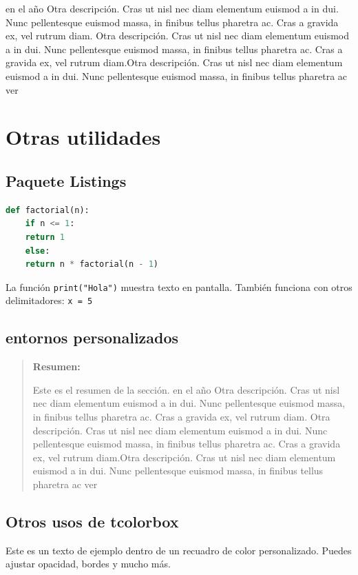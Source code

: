 \documentclass[b5paper, 10pt]{book}
\newenvironment{miResumen}
{
	\begin{quote}
		\bfseries Resumen:\quad
	}
	{
	\end{quote}
}
\begin{document}
\citeauthor{Liang2022} en el año \citeyear{Liang2022} Otra descripción. Cras ut nisl nec diam elementum euismod a in dui. Nunc pellentesque euismod massa, in finibus tellus pharetra ac. Cras a gravida ex, vel rutrum diam. Otra descripción. Cras ut nisl nec diam elementum euismod a in dui. Nunc pellentesque euismod massa, in finibus tellus pharetra ac. Cras a gravida ex, vel rutrum diam.Otra descripción. Cras ut nisl nec diam elementum euismod a in dui. Nunc pellentesque euismod massa, in finibus tellus pharetra ac ver

\chapter {Otras utilidades}
\section {Paquete Listings}
\begin{lstlisting}[language=Python,caption={Ejemplo en Python},label={code:python}]
	def factorial(n):
	if n <= 1:
	return 1
	else:
	return n * factorial(n - 1)
\end{lstlisting}

La función \lstinline|print("Hola")| muestra texto en pantalla.
También funciona con otros delimitadores: \lstinline!x = 5!


\section {entornos personalizados}
\begin{miResumen}
	Este es el resumen de la sección. \citeauthor{Liang2022} en el año \citeyear{Liang2022} Otra descripción. Cras ut nisl nec diam elementum euismod a in dui. Nunc pellentesque euismod massa, in finibus tellus pharetra ac. Cras a gravida ex, vel rutrum diam. Otra descripción. Cras ut nisl nec diam elementum euismod a in dui. Nunc pellentesque euismod massa, in finibus tellus pharetra ac. Cras a gravida ex, vel rutrum diam.Otra descripción. Cras ut nisl nec diam elementum euismod a in dui. Nunc pellentesque euismod massa, in finibus tellus pharetra ac ver
\end{miResumen}

\section {Otros usos de tcolorbox}
\begin{tcolorbox}[colback=blue!5!white,colframe=blue!75!black,title=Ejemplo de tcolorbox]
	Este es un texto de ejemplo dentro de un recuadro de color personalizado.  
	Puedes ajustar opacidad, bordes y mucho más.
\end{tcolorbox}
\end{document}
